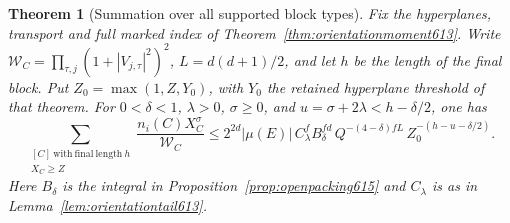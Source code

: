 \documentclass[a4paper,11pt]{article}
\newtheorem{theorem}[proposition]{Theorem}
\theoremstyle{definition}
\theoremstyle{remark}
\numberwithin{equation}{section}
\begin{document}
\begin{theorem}[Summation over all supported block types]
\leavevmode\label{thm:pivotpacking619}
Fix the hyperplanes, transport and full marked index of
Theorem~\ref{thm:orientationmoment613}. Write
\(\mathcal W_C=\prod_{\tau,j}(1+|V_{j,\tau}|^2)^2\),
\(L=d(d+1)/2\), and let \(h\) be the length of the final block.
Put \(Z_0=\max(1,Z,Y_0)\), with \(Y_0\) the retained hyperplane
threshold of that theorem. For \(0<\delta<1\), \(\lambda>0\),
\(\sigma\ge0\), and
\(u=\sigma+2\lambda<h-\delta/2\), one has
\[
 \sum_{\substack{[C]\ \mathrm{with\ final\ length}\ h\\X_C\ge Z}}
       \frac{n_i(C)X_C^\sigma}{\mathcal W_C}
 \le
 2^{2d}|\mu(E)|\,C_\lambda^f B_\delta^{fd}\,
 Q^{-(4-\delta)fL}\,Z_0^{-(h-u-\delta/2)} .
\]
Here \(B_\delta\) is the integral in
Proposition~\ref{prop:openpacking615} and \(C_\lambda\) is as in
Lemma~\ref{lem:orientationtail613}.
\end{theorem}
\end{document}
